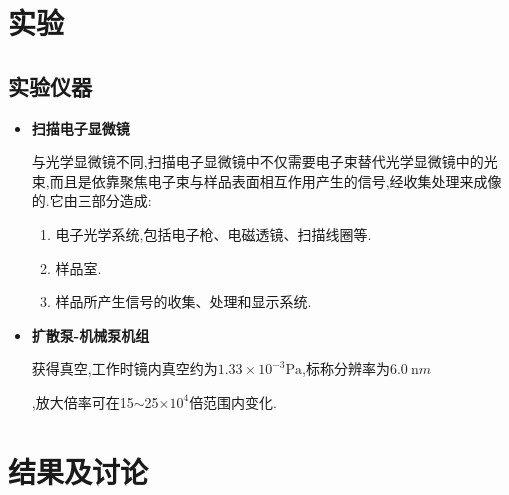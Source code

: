 \documentclass[a4paper]{article}
\begin{document}
\newpage
\section{实验} \label{experiment}%
\subsection{实验仪器}\label{sub:instruments}
\begin{itemize}
\item{\textbf{扫描电子显微镜}}

与光学显微镜不同,扫描电子显微镜中不仅需要电子束替代光学显微镜中的光束,而且是依靠聚焦电子束与样品表面相互作用产生的信号,经收集处理来成像的.它由三部分造成:
\begin{enumerate}[1.]
    \item 电子光学系统,包括电子枪、电磁透镜、扫描线圈等.
    \item 样品室.
    \item 样品所产生信号的收集、处理和显示系统.
\end{enumerate}
\item{\textbf{扩散泵-机械泵机组}

获得真空,工作时镜内真空约为$1.33\times10^{-3}\si{\Pa}$,标称分辨率为$\SI{6.0}{\nano m}$},放大倍率可在15$\sim$25$\times10^4$倍范围内变化.
\end{itemize}

\newpage
\section{结果及讨论}
\end{document}
